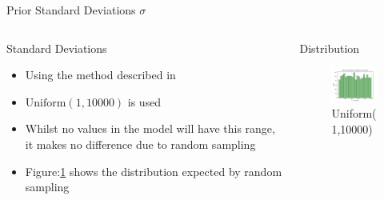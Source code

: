 \documentclass[t, aspectratio=169]{beamer}
\begin{document}
\begin{frame}[label={sec:org5f2056a}]{Prior Standard Deviations \(\sigma\)}
\begin{columns}
\begin{column}{0.6\columnwidth}
\begin{block}{Standard Deviations}
\begin{itemize}
\item Using the method described in \citep{Kruschke2012}
\item \(\text{Uniform}(1,10000)\) is used
\item Whilst no values in the model will have this range, it makes no difference due to random sampling
\item Figure:\ref{fig:orgd2ed836} shows the distribution expected by random sampling
\end{itemize}
\end{block}
\end{column}
\begin{column}{0.4\columnwidth}
\begin{block}{Distribution}
\begin{figure}[htbp]
\centering
\includegraphics[width=4.5cm]{./images/dist.png}
\caption{\label{fig:orgd2ed836}
Uniform(1,10000)}
\end{figure}
\end{block}
\end{column}
\end{columns}
\end{frame}
\end{document}

